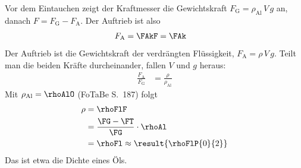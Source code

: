 Vor dem Eintauchen zeigt der Kraftmesser die Gewichtskraft $F_\text{G} = \rho_\text{Al}\,V\,g$ an, danach $F = F_\text{G} - F_\text{A}$. Der Auftrieb ist also
\begin{align}
 F_\text{A} &= \FAkF = \FAk
\end{align}
Der Auftrieb ist die Gewichtskraft der verdrängten Flüssigkeit, $F_\text{A} = \rho\,V\,g$. Teilt man die beiden Kräfte durcheinander, fallen $V$ und $g$ heraus:
\begin{align}
 \frac{F_\text{A}}{F_\text{G}} &= \frac{\rho}{\rho_\text{Al}}
\end{align}
Mit $\rho_\text{Al} = \rhoAlO$ (FoTaBe S.~187) folgt
\begin{align}
 \rho &= \rhoFlF \\
   &= \frac{\FG-\FT}{\FG}\cdot\rhoAl \\
   &= \rhoFl \approx \result{\rhoFlP{0}{2}}
\end{align}
Das ist etwa die Dichte eines Öls.
